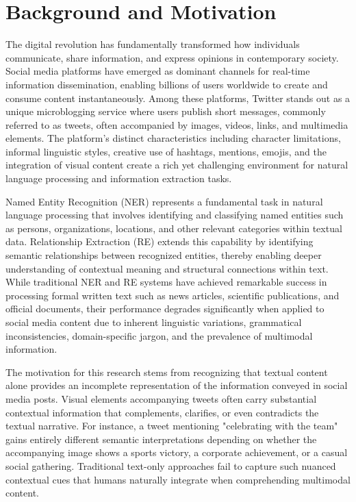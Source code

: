 \documentclass[12pt,a4paper]{report}
\begin{document}
\section{Background and Motivation}

The digital revolution has fundamentally transformed how individuals communicate, share information, and express opinions in contemporary society. Social media platforms have emerged as dominant channels for real-time information dissemination, enabling billions of users worldwide to create and consume content instantaneously. Among these platforms, Twitter stands out as a unique microblogging service where users publish short messages, commonly referred to as tweets, often accompanied by images, videos, links, and multimedia elements. The platform's distinct characteristics including character limitations, informal linguistic styles, creative use of hashtags, mentions, emojis, and the integration of visual content create a rich yet challenging environment for natural language processing and information extraction tasks.

Named Entity Recognition (NER) represents a fundamental task in natural language processing that involves identifying and classifying named entities such as persons, organizations, locations, and other relevant categories within textual data. Relationship Extraction (RE) extends this capability by identifying semantic relationships between recognized entities, thereby enabling deeper understanding of contextual meaning and structural connections within text. While traditional NER and RE systems have achieved remarkable success in processing formal written text such as news articles, scientific publications, and official documents, their performance degrades significantly when applied to social media content due to inherent linguistic variations, grammatical inconsistencies, domain-specific jargon, and the prevalence of multimodal information.

The motivation for this research stems from recognizing that textual content alone provides an incomplete representation of the information conveyed in social media posts. Visual elements accompanying tweets often carry substantial contextual information that complements, clarifies, or even contradicts the textual narrative. For instance, a tweet mentioning "celebrating with the team" gains entirely different semantic interpretations depending on whether the accompanying image shows a sports victory, a corporate achievement, or a casual social gathering. Traditional text-only approaches fail to capture such nuanced contextual cues that humans naturally integrate when comprehending multimodal content.
\end{document}
